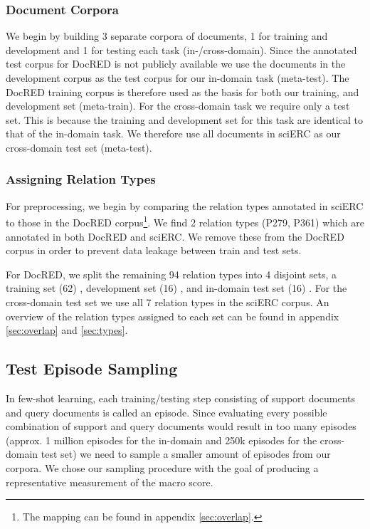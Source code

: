 \documentclass[11pt]{article}
\begin{document}
\subsubsection{Document Corpora}
We begin by building 3 separate corpora of documents, 1 for training and development and 1 for testing each task (in-/cross-domain). Since the annotated test corpus for DocRED is not publicly available we use the documents in the development corpus as the test corpus for our in-domain task (meta-test). The DocRED training corpus is therefore used as the basis for both our training, and development set (meta-train). For the cross-domain task we require only a test set. This is because the training and development set for this task are identical to that of the in-domain task. We therefore use all documents in sciERC as our cross-domain test set (meta-test).
\subsubsection{Assigning Relation Types}
For preprocessing, we begin by comparing the relation types annotated in sciERC to those in the DocRED corpus\footnote{The mapping can be found in appendix \ref{sec:overlap}.}.
We find 2 relation types (P279, P361) which are annotated in both DocRED and sciERC. 
We remove these from the DocRED corpus in order to prevent data leakage between train and test sets. 

For DocRED, we split the remaining 94 relation types into 4 disjoint sets, a training set (62) , development set (16) , and in-domain test set (16) . 
For the cross-domain test set we use all 7 relation types in the sciERC corpus. 
An overview of the relation types assigned to each set can be found in appendix \ref{sec:overlap} and \ref{sec:types}.





\subsection{Test Episode Sampling}
In few-shot learning, each training/testing step consisting of support documents and query documents is called an episode.
Since evaluating every possible combination of support and query documents would result in too many episodes (approx. 1 million episodes for the in-domain and 250k episodes for the cross-domain test set) we need to sample a smaller amount of episodes from our corpora. 
We chose our sampling procedure with the goal of producing a representative measurement of the macro  score.
\end{document}
